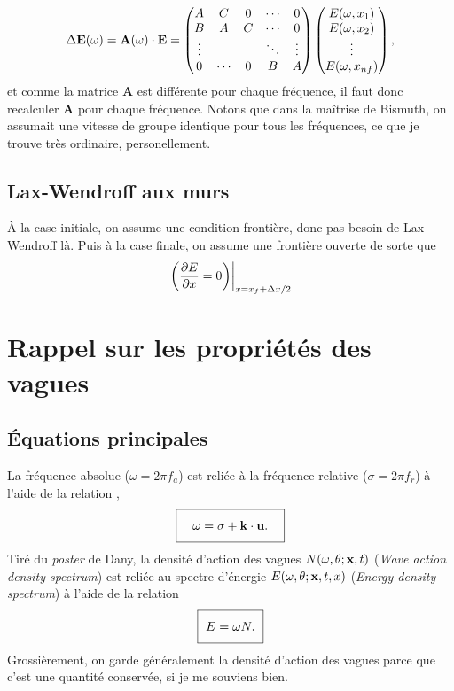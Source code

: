 \documentclass[10pt]{article}
\numberwithin{equation}{section}
\newcommand{\grande}{\vphantom{\frac{1}{xx}}}
\begin{document}
\begin{equation}
   \Delta \mathbf{E}(\omega) = \mathbf{A}(\omega)\cdot\vb{E} = \begin{pmatrix}
       A & C & 0 & \cdots & 0 \\
       B & A & C & \cdots & 0 \\
       \vdots & & & \ddots & \vdots\\
       0 & \cdots & 0 & B & A \\
     \end{pmatrix}\begin{pmatrix}
       E(\omega,x_1) \\
       E(\omega,x_2) \\
       \vdots\\
       E(\omega,x_{nf}) \\
     \end{pmatrix},
\end{equation}
et comme la matrice \textbf{A} est différente pour chaque fréquence, il faut donc recalculer \textbf{A} pour chaque fréquence.
Notons que dans la maîtrise de Bismuth, on assumait une vitesse de groupe identique pour tous les fréquences, ce que je trouve très ordinaire, personellement.
\subsection{Lax-Wendroff aux murs}
\label{sec:orgf7fc3df}
À la case initiale, on assume une condition frontière, donc pas besoin de Lax-Wendroff là.
Puis à la case finale, on assume une frontière ouverte de sorte que
\begin{equation}
   \eval{\qty(\pdv{E}{x} = 0)}_{x = x_f + \Delta x/2}
\end{equation}
\section{Rappel sur les propriétés des vagues}
\label{sec:org21f37da}

\subsection{Équations principales}
\label{sec:org2e7fb59}

La fréquence absolue (\(\omega = 2\pi f_a\)) est reliée à la fréquence relative (\(\sigma = 2\pi f_r\)) à l'aide de la relation \autocite{wwiii2016user,Ardhuin2024ocean},
\begin{equation}
   \boxed{\grande\quad\omega = \sigma + \vb{k}\cdot\vb{u}.\quad}
\end{equation}
Tiré du \emph{poster} de Dany, la densité d'action des vagues \(N(\omega, \theta; \vb{x}, t)\) (\emph{Wave action density spectrum}) est reliée au spectre d'énergie \(E(\omega, \theta; \vb{x}, t, x)\) (\emph{Energy density spectrum}) à l'aide de la relation
\begin{equation}
   \boxed{\ \grande E = \omega N.\ }
\end{equation}
Grossièrement, on garde généralement la densité d'action des vagues parce que c'est une quantité conservée, si je me souviens bien. 
\end{document}
